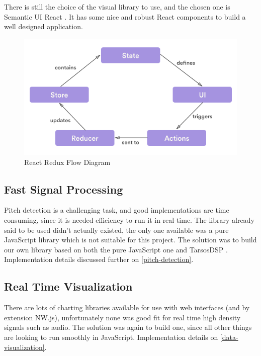 There is still the choice of the visual library to use, and the chosen one is
Semantic UI React \cite{semantic-ui}. It has some nice and robust React components
to build a well designed application.

\begin{figure}[htb]
  \centering
  \caption{React Redux Flow Diagram}
  \label{react-redux-diagram}
  \includegraphics[scale=0.5]{images/react-redux-diagram}
\end{figure}

\subsection{Fast Signal Processing}
Pitch detection is a challenging task, and good implementations are time
consuming, since it is needed efficiency to run it in real-time. The library already said
to be used didn't actually existed, the only one available was a pure JavaScript
library \cite{pitchfinder} which is not suitable for this project. The solution
was to build our own library based on both the pure JavaScript one and TarsosDSP
\cite{TarsosDSP}. Implementation details discussed further on \autoref{pitch-detection}.

\subsection{Real Time Visualization}
There are lots of charting libraries available for use with web interfaces (and
by extension NW.js), unfortunately none was good fit for real time high density
signals such as audio. The solution was again to build one, since all other things
are looking to run smoothly in JavaScript. Implementation details on \autoref{data-visualization}.
